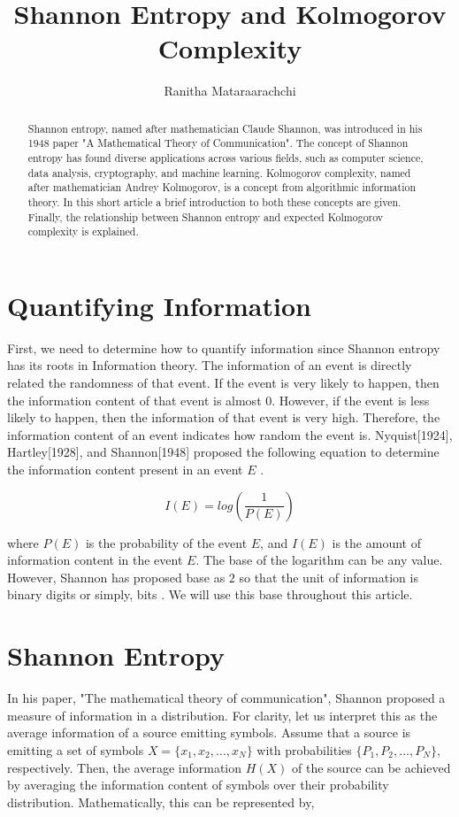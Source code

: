 \documentclass[]{article}
\title{Shannon Entropy and Kolmogorov Complexity}
\author{Ranitha Mataraarachchi}
\begin{document}
\maketitle

\begin{abstract}
Shannon entropy, named after mathematician Claude Shannon, was introduced in his 1948 paper "A Mathematical Theory of Communication"\cite{shannon}. The concept of Shannon entropy has found diverse applications across various fields, such as computer science, data analysis, cryptography, and machine learning. Kolmogorov complexity, named after mathematician Andrey Kolmogorov, is a concept from algorithmic information theory. In this short article a brief introduction to both these concepts are given. Finally, the relationship between Shannon entropy and expected Kolmogorov complexity is explained. 
\end{abstract}

\section{Quantifying Information}
First, we need to determine how to quantify information since Shannon entropy has its roots in Information theory. The information of an event is directly related the randomness of that event. If the event is very likely to happen, then the information content of that event is almost $0$. However, if the event is less likely to happen, then the  information of that event is very high. Therefore, the information content of an event indicates how random the event is. Nyquist[1924], Hartley[1928], and Shannon[1948] proposed the following equation to determine the information content present in an event $E$ \cite{drAruna}. 

$$I(E) = log\left(\frac{1}{P(E)}\right)$$

where $P(E)$ is the probability of the event $E$, and $I(E)$ is the amount of information content in the event $E$. The base of the logarithm can be any value. However, Shannon has proposed base as $2$ so that the unit of information is binary digits or simply, bits \cite{drAruna}. We will use this base throughout this article. 

\section{Shannon Entropy}

In his paper, "The mathematical theory of communication"\cite{shannon}, Shannon proposed a measure of information in a distribution. For clarity, let us interpret this as the average information of a source emitting symbols. Assume that a source is emitting a set of symbols $X=\{x_1,x_2,\dots,x_N\}$ with probabilities $\{P_1,P_2,\dots,P_N\}$, respectively. Then, the average information $H(X)$ of the source can be achieved by averaging the information content of symbols over their probability distribution. Mathematically, this can be represented by,
\end{document}

